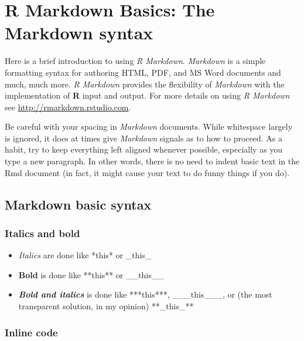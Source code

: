 \documentclass[a4paper, twoside]{templates/ociamthesis}
\providecommand{\tightlist}{%
  \setlength{\itemsep}{0pt}\setlength{\parskip}{0pt}}
\begin{document}
\hypertarget{rmd-basics}{%
\chapter{R Markdown Basics: The Markdown syntax}\label{rmd-basics}}

\minitoc 

Here is a brief introduction to using \emph{R Markdown}.
\emph{Markdown} is a simple formatting syntax for authoring HTML, PDF, and MS Word documents and much, much more.
\emph{R Markdown} provides the flexibility of \emph{Markdown} with the implementation of \textbf{R} input and output. For more details on using \emph{R Markdown} see \url{http://rmarkdown.rstudio.com}.

Be careful with your spacing in \emph{Markdown} documents.
While whitespace largely is ignored, it does at times give \emph{Markdown} signals as to how to proceed.
As a habit, try to keep everything left aligned whenever possible, especially as you type a new paragraph.
In other words, there is no need to indent basic text in the Rmd document (in fact, it might cause your text to do funny things if you do).

\hypertarget{markdown-basic-syntax}{%
\section{Markdown basic syntax}\label{markdown-basic-syntax}}

\hypertarget{italics-and-bold}{%
\subsection{Italics and bold}\label{italics-and-bold}}

\begin{itemize}
\tightlist
\item
  \emph{Italics} are done like *this* or \_this\_
\item
  \textbf{Bold} is done like **this** or \_\_this\_\_
\item
  \textbf{\emph{Bold and italics}} is done like ***this***, \_\_\_this\_\_\_, or (the most transparent solution, in my opinion) **\_this\_**
\end{itemize}

\hypertarget{inline-code}{%
\subsection{Inline code}\label{inline-code}}
\end{document}
